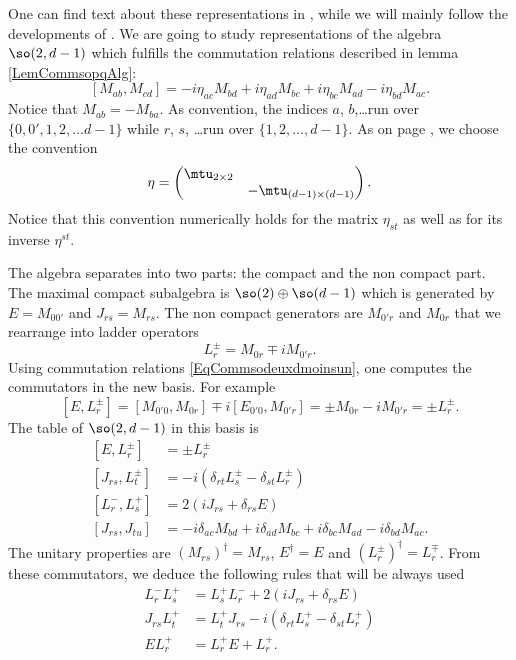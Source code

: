 One can find text about these representations in \cite{Ferrata,Dolan_son,SingString}, while we will mainly follow the developments of \cite{SingletonCompposites,HowMassless,Teschner}. We are going to study representations of the algebra $\so(2,d-1)$ which fulfills the commutation relations described in lemma \ref{LemCommsopqAlg}:
\begin{equation}		\label{EqCommsodeuxdmoinsun}
	[M_{ab},M_{cd}]=-i\eta_{ac}M_{bd}+i\eta_{ad}M_{bc}+i\eta_{bc}M_{ad}-i\eta_{bd}M_{ac}.
\end{equation}
Notice that $M_{ab}=-M_{ba}$. As convention, the indices $a$, $b$,\ldots run over $\{ 0,0',1,2,\ldots d-1 \}$ while $r$, $s$, \ldots run over $\{ 1,2,\ldots,d-1 \}$. As on page \pageref{PgDefsGenre}, we choose the convention
\begin{equation}
	\eta =
	\begin{pmatrix}
		\mtu_{2\times 2}\\
		&-\mtu_{(d-1)\times (d-1)}
	\end{pmatrix}.
\end{equation}
Notice that this convention numerically holds for the matrix $\eta_{st}$ as well as for its inverse $\eta^{st}$.

The algebra separates into two parts: the compact and the non compact part. The maximal compact subalgebra is $\so(2)\oplus\so(d-1)$ which is generated by $E=M_{00'}$ and $J_{rs}=M_{rs}$. The non compact generators are $M_{0'r}$ and $M_{0r}$ that we rearrange into ladder operators
\begin{equation}
	L^{\pm}_r=M_{0r}\mp iM_{0'r}.
\end{equation}
Using commutation relations \eqref{EqCommsodeuxdmoinsun}, one computes the commutators in the new basis. For example
\[ 
	[E,L^{\pm}_r]=[M_{0'0},M_{0r}]\mp i[E_{0'0},M_{0'r}]=\pm M_{0r}-iM_{0'r}=\pm L^{\pm}_r.
\]
The table of $\so(2,d-1)$ in this basis is
\begin{subequations}		\label{SubEqsCommssodeuxd}
	\begin{align}
		[E,L^{\pm}_r]&=\pm L^{\pm}_r\\
		[J_{rs},L_t^{\pm}]&=-i(\delta_{rt}L_s^{\pm}-\delta_{st}L_r^{\pm})\\
		[L_r^{-},L_s^+]&=2(iJ_{rs}+\delta_{rs}E)\\
		[J_{rs},J_{tu}]&=-i\delta_{ac}M_{bd}+i\delta_{ad}M_{bc}+i\delta_{bc}M_{ad}-i\delta_{bd}M_{ac}.
	\end{align}
\end{subequations}
The unitary properties are $(M_{rs})^{\dag}=M_{rs}$, $E^{\dag}=E$ and $(L^{\pm}_r)^{\dag}=L_r^{\mp}$. From these commutators, we deduce the following rules that will be always used
\begin{subequations}
	\begin{align}
		L^-_rL^+_s&=L^+_sL^-_r+2(iJ_{rs}+\delta_{rs}E)\\
		J_{rs}L^+_t&=L^+_tJ_{rs}-i(\delta_{rt}L^+_s-\delta_{st}L^+_r)\\
		EL^+_r&=L^+_rE+L^+_r.
	\end{align}
\end{subequations}

